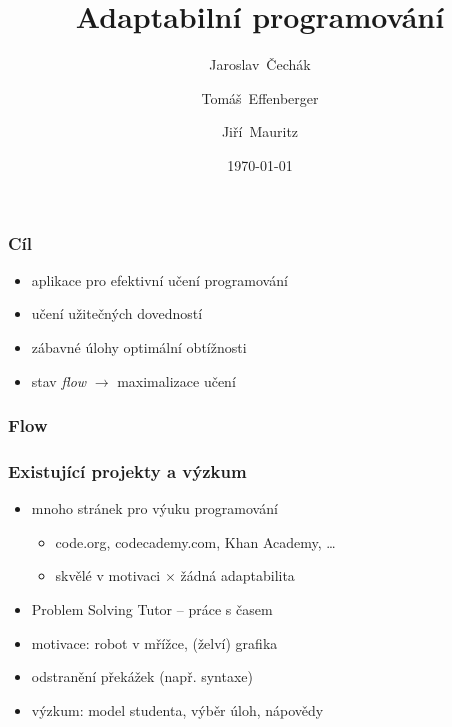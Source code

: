 \documentclass[xcolor=dvipsnames, 14pt]{beamer}
\title{Adaptabilní programování}
\author{Jaroslav~Čechák \and Tomáš~Effenberger \and  Jiří~Mauritz}
\institute{Fakulta informatiky, Masarykova univerzita}
\date{\today}
\begin{document}
\begin{frame}
\titlepage
\end{frame}

\begin{frame}
\frametitle{Cíl}
\begin{itemize}
\item aplikace pro efektivní učení programování
\item učení užitečných dovedností
\item zábavné úlohy optimální obtížnosti
\item stav \emph{flow} $\rightarrow$ maximalizace učení
\end{itemize}
\end{frame}

\begin{frame}
\frametitle{Flow}
\begin{figure}[h]
  \centering
\end{figure}
\end{frame}

\begin{frame}
\frametitle{Existující projekty a výzkum}
\begin{itemize}
\item mnoho stránek pro výuku programování
  \begin{itemize}
  \item code.org, codecademy.com, Khan Academy, \ldots
  \item skvělé v motivaci $\times$ žádná adaptabilita
  \end{itemize}
\item Problem Solving Tutor -- práce s časem %
\item motivace: robot v mřížce, (želví) grafika
\item odstranění překážek (např. syntaxe)
\item výzkum: model studenta, výběr úloh, nápovědy
\end{itemize}
\end{frame}
\end{document}
